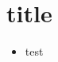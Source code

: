 \documentclass{beamer}
\begin{document}
\section{title}
\begin{frame}
\tableofcontents
\begin{itemize}
\item test
\end{itemize}
\end{frame} 
\end{document}
